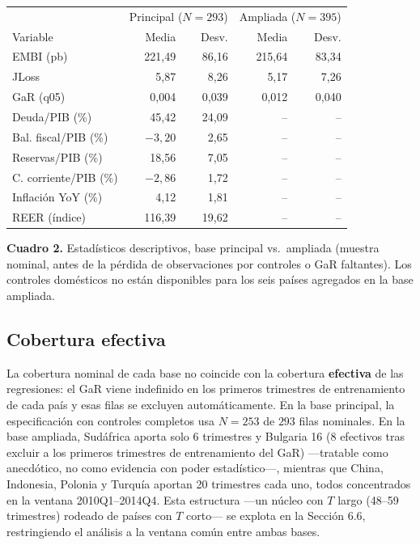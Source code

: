 \documentclass[5p,times,twocolumn,authoryear]{elsarticle}
\begin{document}
\begin{center}
\footnotesize
\begin{tabular}{lrrrr}
\toprule
 & \multicolumn{2}{c}{Principal ($N=293$)} & \multicolumn{2}{c}{Ampliada ($N=395$)} \\
Variable & Media & Desv. & Media & Desv. \\
\midrule
EMBI (pb)     & 221,49 & 86,16 & 215,64 & 83,34 \\
JLoss         & 5,87   & 8,26  & 5,17   & 7,26  \\
GaR (q05)     & 0,004  & 0,039 & 0,012  & 0,040 \\
Deuda/PIB (\%)& 45,42  & 24,09 & --     & --    \\
Bal. fiscal/PIB (\%) & $-3,20$ & 2,65 & --     & --    \\
Reservas/PIB (\%)    & 18,56 & 7,05  & --     & --    \\
C. corriente/PIB (\%)& $-2,86$ & 1,72 & --     & --    \\
Inflación YoY (\%)   & 4,12 & 1,81  & --     & --    \\
REER (índice)        & 116,39 & 19,62 & --     & --    \\
\bottomrule
\end{tabular}

\medskip
\footnotesize\textbf{Cuadro 2.} Estadísticos descriptivos, base principal vs.\ ampliada (muestra nominal, antes de la pérdida de observaciones por controles o GaR faltantes). Los controles domésticos no están disponibles para los seis países agregados en la base ampliada.
\end{center}

\subsection{Cobertura efectiva}

La cobertura nominal de cada base no coincide con la cobertura \textbf{efectiva} de las regresiones: el GaR viene indefinido en los primeros trimestres de entrenamiento de cada país y esas filas se excluyen automáticamente. En la base principal, la especificación con controles completos usa $N=253$ de $293$ filas nominales. En la base ampliada, Sudáfrica aporta solo 6 trimestres y Bulgaria 16 (8 efectivos tras excluir a los primeros trimestres de entrenamiento del GaR) —tratable como anecdótico, no como evidencia con poder estadístico—, mientras que China, Indonesia, Polonia y Turquía aportan 20 trimestres cada uno, todos concentrados en la ventana 2010Q1–2014Q4. Esta estructura —un núcleo con $T$ largo (48–59 trimestres) rodeado de países con $T$ corto— se explota en la Sección 6.6, restringiendo el análisis a la ventana común entre ambas bases.
\end{document}

